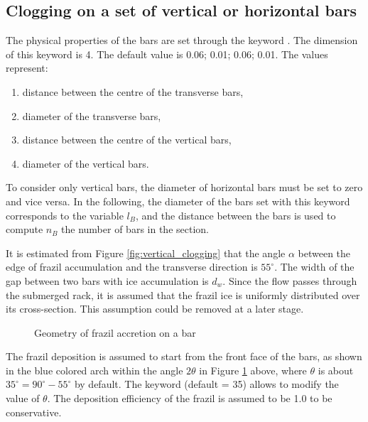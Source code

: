 \subsection{Clogging on a set of vertical or horizontal bars}

The physical properties of the bars are set through the keyword . The dimension of this keyword is 4. The default value is 0.06; 0.01; 0.06; 0.01. The values represent:

\begin{enumerate}
 \item distance between the centre of the transverse bars,
 \item diameter of the transverse bars,
 \item distance between the centre of the vertical bars,
 \item diameter of the vertical bars.
\end{enumerate}

To consider only vertical bars, the diameter of horizontal bars must be set to zero and vice versa. In the following, the diameter of the bars set with this keyword corresponds to the variable $l_B$, and the distance between the bars is used to compute $n_B$ the number of bars in the section.

It is estimated from Figure \ref{fig:vertical_clogging} that the angle $\alpha$ between the edge of frazil accumulation and the transverse direction is $55^{\circ}$. The width of the gap between two bars with ice accumulation is $d_w$. Since the flow passes through the submerged rack, it is assumed that the frazil ice is uniformly distributed over its cross-section. This assumption could be removed at a later stage.\newline

\begin{figure}[H]
    \begin{center}
    \end{center}
    \caption{Geometry of frazil accretion on a bar}
    \label{fig:bar_clogging}
\end{figure}

The frazil deposition is assumed to start from the front face of the bars, as shown in the blue colored arch within the angle $2\theta$ in Figure \ref{fig:bar_clogging} above, where $\theta$ is about $35^{\circ}= 90^{\circ}-55^{\circ}$ by default. The keyword  (default = 35) allows to modify the value of $\theta$. The deposition efficiency of the frazil is assumed to be 1.0 to be conservative. \newline


